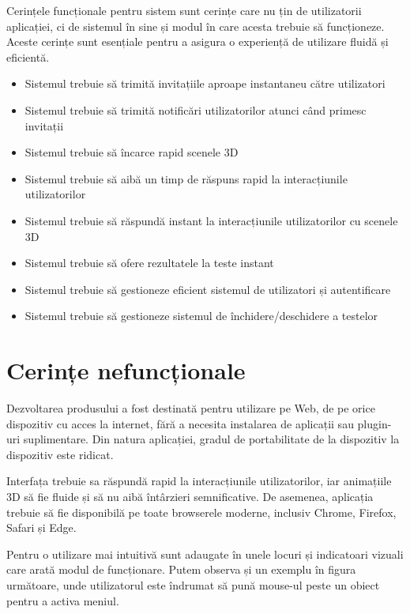 Cerințele funcționale pentru sistem sunt cerințe care nu țin de utilizatorii aplicației, ci de sistemul în sine și modul în care acesta 
trebuie să funcționeze. Aceste cerințe sunt esențiale pentru a asigura o experiență de utilizare fluidă și eficientă. 
\begin{itemize}
    \item Sistemul trebuie să trimită invitațiile aproape instantaneu către utilizatori
    \item Sistemul trebuie să trimită notificări utilizatorilor atunci când primesc invitații
    \item Sistemul trebuie să încarce rapid scenele 3D
    \item Sistemul trebuie să aibă un timp de răspuns rapid la interacțiunile utilizatorilor
    \item Sistemul trebuie să răspundă instant la interacțiunile utilizatorilor cu scenele 3D
    \item Sistemul trebuie să ofere rezultatele la teste instant
    \item Sistemul trebuie să gestioneze eficient sistemul de utilizatori și autentificare
    \item Sistemul trebuie să gestioneze sistemul de închidere/deschidere a testelor
\end{itemize}


\section{Cerințe nefuncționale}
\label{sec:proj-non-functional-requirements}

Dezvoltarea produsului a fost destinată pentru utilizare pe Web, de pe orice dispozitiv cu acces la internet,
fără a necesita instalarea de aplicații sau plugin-uri suplimentare. Din natura aplicației, gradul de portabilitate
de la dispozitiv la dispozitiv este ridicat.

Interfața trebuie sa răspundă rapid la interacțiunile utilizatorilor, iar animațiile 3D să fie fluide și să nu aibă
întârzieri semnificative. De asemenea, aplicația trebuie să fie disponibilă pe toate browserele moderne,
inclusiv Chrome, Firefox, Safari și Edge.


Pentru o utilizare mai intuitivă sunt adaugate în unele locuri și indicatoari vizuali care arată modul de funcționare.
Putem observa și un exemplu în figura următoare, unde utilizatorul este îndrumat să pună mouse-ul peste un obiect
pentru a activa meniul.



